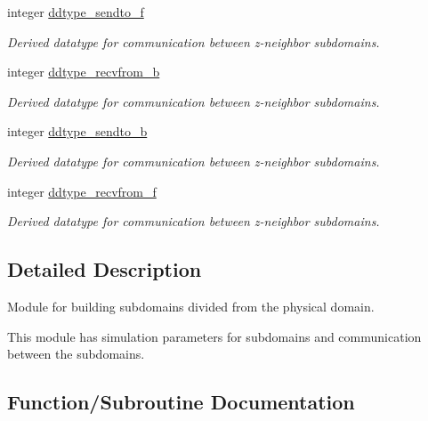 \textbf{ }\par
\begin{DoxyCompactItemize}
\item 
integer \mbox{\hyperlink{namespacempi__subdomain_a4f3d66535b947c7afee75e6e73a47206}{ddtype\+\_\+sendto\+\_\+f}}
\begin{DoxyCompactList}\small\item\em Derived datatype for communication between z-\/neighbor subdomains. \end{DoxyCompactList}\item 
integer \mbox{\hyperlink{namespacempi__subdomain_ad6462f18c8c68c076005957e9d062252}{ddtype\+\_\+recvfrom\+\_\+b}}
\begin{DoxyCompactList}\small\item\em Derived datatype for communication between z-\/neighbor subdomains. \end{DoxyCompactList}\item 
integer \mbox{\hyperlink{namespacempi__subdomain_a7a2af0322a7aaa435951a5432859687a}{ddtype\+\_\+sendto\+\_\+b}}
\begin{DoxyCompactList}\small\item\em Derived datatype for communication between z-\/neighbor subdomains. \end{DoxyCompactList}\item 
integer \mbox{\hyperlink{namespacempi__subdomain_a4da19838e8bc3934ad5c24db424bec2c}{ddtype\+\_\+recvfrom\+\_\+f}}
\begin{DoxyCompactList}\small\item\em Derived datatype for communication between z-\/neighbor subdomains. \end{DoxyCompactList}\end{DoxyCompactItemize}



\subsection{Detailed Description}
Module for building subdomains divided from the physical domain. 

This module has simulation parameters for subdomains and communication between the subdomains. 

\subsection{Function/\+Subroutine Documentation}
\mbox{\label{namespacempi__subdomain_a55659431068678c08d21847338390ea8}} 
